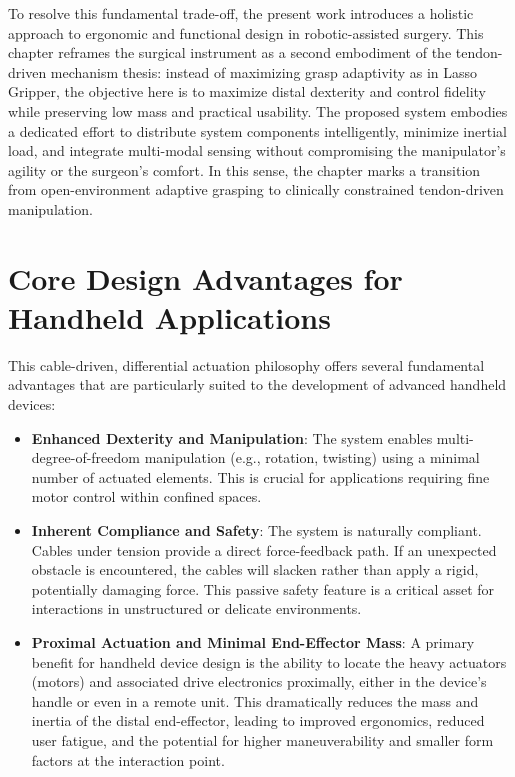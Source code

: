 To resolve this fundamental trade-off, the present work introduces a holistic approach to ergonomic and functional design in robotic-assisted surgery. This chapter reframes the surgical instrument as a second embodiment of the tendon-driven mechanism thesis: instead of maximizing grasp adaptivity as in Lasso Gripper, the objective here is to maximize distal dexterity and control fidelity while preserving low mass and practical usability. The proposed system embodies a dedicated effort to distribute system components intelligently, minimize inertial load, and integrate multi-modal sensing without compromising the manipulator's agility or the surgeon's comfort. In this sense, the chapter marks a transition from open-environment adaptive grasping to clinically constrained tendon-driven manipulation.


\section{Core Design Advantages for Handheld Applications}

This cable-driven, differential actuation philosophy offers several fundamental advantages that are particularly suited to the development of advanced handheld devices:

\begin{itemize}
\item \textbf{Enhanced Dexterity and Manipulation}: The system enables multi-degree-of-freedom manipulation (e.g., rotation, twisting) using a minimal number of actuated elements. This is crucial for applications requiring fine motor control within confined spaces.

\item \textbf{Inherent Compliance and Safety}: The system is naturally compliant. Cables under tension provide a direct force-feedback path. If an unexpected obstacle is encountered, the cables will slacken rather than apply a rigid, potentially damaging force. This passive safety feature is a critical asset for interactions in unstructured or delicate environments.

\item \textbf{Proximal Actuation and Minimal End-Effector Mass}: A primary benefit for handheld device design is the ability to locate the heavy actuators (motors) and associated drive electronics proximally, either in the device's handle or even in a remote unit. This dramatically reduces the mass and inertia of the distal end-effector, leading to improved ergonomics, reduced user fatigue, and the potential for higher maneuverability and smaller form factors at the interaction point.
\end{itemize}

